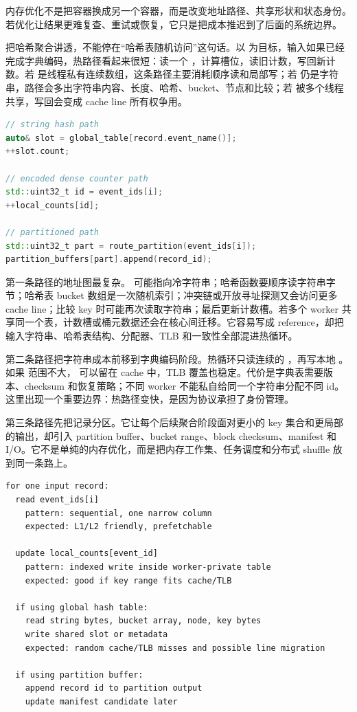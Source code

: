 \begin{mentalmodel}
内存优化不是把容器换成另一个容器，而是改变地址路径、共享形状和状态身份。若优化让结果更难复查、重试或恢复，它只是把成本推迟到了后面的系统边界。
\end{mentalmodel}

把哈希聚合讲透，不能停在“哈希表随机访问”这句话。以  为目标，输入如果已经完成字典编码，热路径看起来很短：读一个 ，计算槽位，读旧计数，写回新计数。若  是线程私有连续数组，这条路径主要消耗顺序读和局部写；若  仍是字符串，路径会多出字符串内容、长度、哈希、bucket、节点和比较；若  被多个线程共享，写回会变成 cache line 所有权争用。

\begin{lstlisting}[language=C++,caption={同一个业务更新的三种地址形状}]
// string hash path
auto& slot = global_table[record.event_name()];
++slot.count;

// encoded dense counter path
std::uint32_t id = event_ids[i];
++local_counts[id];

// partitioned path
std::uint32_t part = route_partition(event_ids[i]);
partition_buffers[part].append(record_id);
\end{lstlisting}

第一条路径的地址图最复杂。 可能指向冷字符串；哈希函数要顺序读字符串字节；哈希表 bucket 数组是一次随机索引；冲突链或开放寻址探测又会访问更多 cache line；比较 key 时可能再次读取字符串；最后更新计数槽。若多个 worker 共享同一个表，计数槽或桶元数据还会在核心间迁移。它容易写成 reference，却把输入字符串、哈希表结构、分配器、TLB 和一致性全部混进热循环。

第二条路径把字符串成本前移到字典编码阶段。热循环只读连续的 ，再写本地 。如果  范围不大， 可以留在 cache 中，TLB 覆盖也稳定。代价是字典表需要版本、checksum 和恢复策略；不同 worker 不能私自给同一个字符串分配不同 id。这里出现一个重要边界：热路径变快，是因为协议承担了身份管理。

第三条路径先把记录分区。它让每个后续聚合阶段面对更小的 key 集合和更局部的输出，却引入 partition buffer、bucket range、block checksum、manifest 和 I/O。它不是单纯的内存优化，而是把内存工作集、任务调度和分布式 shuffle 放到同一条路上。

\begin{lstlisting}[numbers=none,caption={一次更新的地址账本}]
for one input record:
  read event_ids[i]
    pattern: sequential, one narrow column
    expected: L1/L2 friendly, prefetchable

  update local_counts[event_id]
    pattern: indexed write inside worker-private table
    expected: good if key range fits cache/TLB

  if using global hash table:
    read string bytes, bucket array, node, key bytes
    write shared slot or metadata
    expected: random cache/TLB misses and possible line migration

  if using partition buffer:
    append record id to partition output
    update manifest candidate later
\end{lstlisting}

